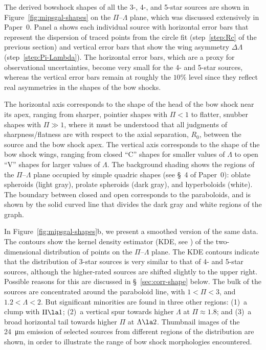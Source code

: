 The derived bowshock shapes of all the 3-, 4-, and 5-star sources are
shown in Figure~\ref{fig:mipsgal-shapes} on the \(\Pi\)--\(\Lambda\) plane,
which was discussed extensively in Paper~0.  Panel a shows each
individual source with horizontal error bars that represent the
dispersion of traced points from the circle fit (step~\ref{step:Rc} of
the previous section) and vertical error bars that show the wing
asymmetry \(\Delta\Lambda\) (step~\ref{step:Pi-Lambda}).  The horizontal error
bars, which are a proxy for observational uncertainties, become very
small for the 4- and 5-star sources, whereas the vertical error bars
remain at roughly the \(10\%\) level since they reflect real
asymmetries in the shapes of the bow shocks.

The horizontal axis corresponds to the shape of the head of the bow
shock near its apex, ranging from sharper, pointier shapes with
\(\Pi < 1\) to flatter, snubber shapes with \(\Pi \gg 1\), where it must be
understood that all judgments of sharpness/flatness are with respect
to the axial separation, \(R_0\), between the source and the bow shock
apex.  The vertical axis corresponds to the shape of the bow shock
wings, ranging from closed ``C'' shapes for smaller values of
\(\Lambda\) to open ``V'' shapes for larger values of \(\Lambda\).  The background
shading shows the regions of the \(\Pi\)--\(\Lambda\) plane occupied by simple
quadric shapes (see \S~4 of Paper~0): oblate spheroids (light gray),
prolate spheroids (dark gray), and hyperboloids (white). The boundary
between closed and open corresponds to the paraboloids, and is shown
by the solid curved line that divides the dark gray and white regions
of the graph.

In Figure~\ref{fig:mipsgal-shapes}b, we present a smoothed version of
the same data.  The contours show the kernel density estimator (KDE,
see \citealp{Leiva-Murillo:2012a, Scott:2015a}) of the two-dimensional
distribution of points on the \(\Pi\)--\(\Lambda\) plane.  The KDE contours
indicate that the distribution of 3-star sources is very similar to
that of 4- and 5-star sources, although the higher-rated sources are
shifted slightly to the upper right.  Possible reasons for this are
discussed in \S~\ref{sec:corr-shape} below.
The bulk of the sources are concentrated around the paraboloid line,
with \(1 < \Pi < 3\), and \(1.2 < \Lambda < 2\).  But significant minorities
are found in three other regions: (1)~a clump with \(\Pi \la 1\); (2)~a
vertical spur towards higher \(\Lambda\) at \(\Pi \approx 1.8\); and (3)~a broad
horizontal tail towards higher \(\Pi\) at \(\Lambda \la 2\).  Thumbnail images
of the \SI{24}{\um} emission of selected sources from different
regions of the distribution are shown, in order to illustrate the
range of bow shock morphologies encountered.


